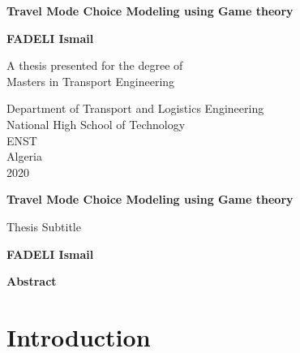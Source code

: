\documentclass[12pt]{report}
\begin{document}
\begin{titlepage}

   \begin{center}
   \thisfancypage{%
\setlength{\fboxsep}{10pt}\doublebox}{}
       \vspace*{1cm}
 	   \Huge
       \textbf{Travel Mode Choice Modeling using Game theory}
		\LARGE
		
       \vspace{0.5cm}
        
            
       \vspace{1.5cm}

       \textbf{FADELI Ismail}

       \vfill
            	\normalsize
       A thesis presented for the degree of\\
       Masters in Transport Engineering
            
       \vspace{0.8cm}
     
       
            \Large
       Department of Transport and Logistics Engineering\\
       National High School of Technology \\
       ENST\\
       Algeria\\
       2020
            
   \end{center}
   

\end{titlepage}
\thispagestyle{empty}
\thispagestyle{plain}
\begin{center}
    \Large
    \textbf{Travel Mode Choice Modeling using Game theory}
        
    \vspace{0.4cm}
    \large
    Thesis Subtitle
        
    \vspace{0.4cm}
    \textbf{FADELI Ismail}
       
    \vspace{0.9cm}
    \textbf{Abstract}
\end{center}

\tableofcontents \thispagestyle{empty}
\listoffigures
\listoftables
\clearpage

\thispagestyle{empty}
\section*{Introduction}
\end{document}

